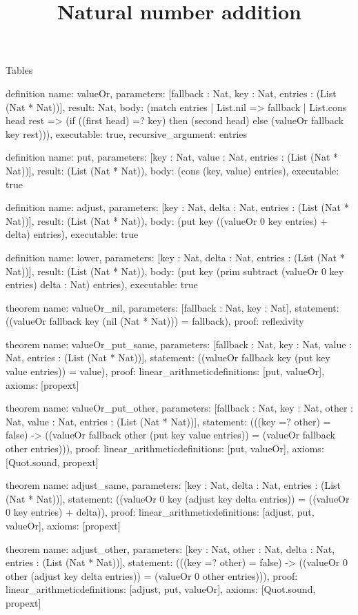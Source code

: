 \begin{lexlean}{Tables}
\title{Natural number addition}
\begin{semanticmodule}
definition{
  name: valueOr,
  parameters: [fallback : Nat, key : Nat, entries : (List (Nat * Nat))],
  result: Nat,
  body: (match entries
    | List.nil => fallback
    | List.cons head rest => (if ((first head) =? key) then (second head) else (valueOr fallback key rest))),
  executable: true,
  recursive_argument: entries
}

definition{
  name: put,
  parameters: [key : Nat, value : Nat, entries : (List (Nat * Nat))],
  result: (List (Nat * Nat)),
  body: (cons (key, value) entries),
  executable: true
}

definition{
  name: adjust,
  parameters: [key : Nat, delta : Nat, entries : (List (Nat * Nat))],
  result: (List (Nat * Nat)),
  body: (put key ((valueOr 0 key entries) + delta) entries),
  executable: true
}

definition{
  name: lower,
  parameters: [key : Nat, delta : Nat, entries : (List (Nat * Nat))],
  result: (List (Nat * Nat)),
  body: (put key (prim subtract (valueOr 0 key entries) delta : Nat) entries),
  executable: true
}

theorem{
  name: valueOr_nil,
  parameters: [fallback : Nat, key : Nat],
  statement: ((valueOr fallback key (nil (Nat * Nat))) = fallback),
  proof: reflexivity{}
}

theorem{
  name: valueOr_put_same,
  parameters: [fallback : Nat, key : Nat, value : Nat, entries : (List (Nat * Nat))],
  statement: ((valueOr fallback key (put key value entries)) = value),
  proof: linear_arithmetic{definitions: [put, valueOr]},
  axioms: [propext]
}

theorem{
  name: valueOr_put_other,
  parameters: [fallback : Nat, key : Nat, other : Nat, value : Nat, entries : (List (Nat * Nat))],
  statement: (((key =? other) = false) -> ((valueOr fallback other (put key value entries)) = (valueOr fallback other entries))),
  proof: linear_arithmetic{definitions: [put, valueOr]},
  axioms: [Quot.sound, propext]
}

theorem{
  name: adjust_same,
  parameters: [key : Nat, delta : Nat, entries : (List (Nat * Nat))],
  statement: ((valueOr 0 key (adjust key delta entries)) = ((valueOr 0 key entries) + delta)),
  proof: linear_arithmetic{definitions: [adjust, put, valueOr]},
  axioms: [propext]
}

theorem{
  name: adjust_other,
  parameters: [key : Nat, other : Nat, delta : Nat, entries : (List (Nat * Nat))],
  statement: (((key =? other) = false) -> ((valueOr 0 other (adjust key delta entries)) = (valueOr 0 other entries))),
  proof: linear_arithmetic{definitions: [adjust, put, valueOr]},
  axioms: [Quot.sound, propext]
}


\end{semanticmodule}
\end{lexlean}
